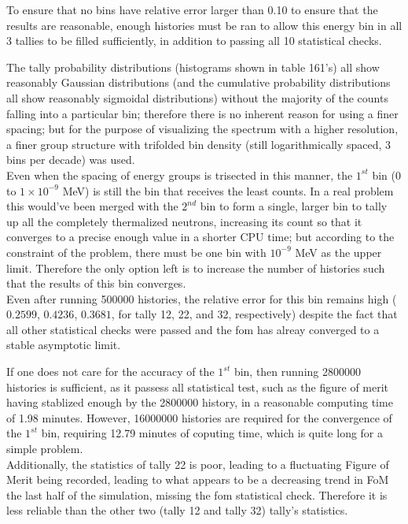 \documentclass[a4paper, 12pt]{article}
\begin{document}
To ensure that no bins have relative error larger than 0.10 to ensure that the results are reasonable, enough histories must be ran to allow this energy bin in all 3 tallies to be filled sufficiently, in addition to passing all 10 statistical checks.

The tally probability distributions (histograms shown in table 161's) all show reasonably Gaussian distributions (and the cumulative probability distributions all show reasonably sigmoidal distributions) without the majority of the counts falling into a particular bin; therefore there is no inherent reason for using a finer spacing; but for the purpose of visualizing the spectrum with a higher resolution, a finer group structure with trifolded bin density (still logarithmically spaced, 3 bins per decade) was used.
\\Even when the spacing of energy groups is trisected in this manner, the $1^{st}$ bin ($0$ to $1\times 10^{-9}$ MeV) is still the bin that receives the least counts. In a real problem this would've been merged with the $2^{nd}$ bin to form a single, larger bin to tally up all the completely thermalized neutrons, increasing its count so that it converges to a precise enough value in a shorter CPU time; but according to the constraint of the problem, there must be one bin with ${10^{-9}}$ MeV as the upper limit. Therefore the only option left is to increase the number of histories such that the results of this bin converges.
\\Even after running 500000 histories, the relative error for this bin remains high ($0.2599$, $0.4236$, $0.3681$, for tally 12, 22, and 32, respectively) despite the fact that all other statistical checks were passed and the fom has alreay converged to a stable asymptotic limit.

If one does not care for the accuracy of the $1^{st}$ bin, then running 2800000 histories is sufficient, as it passess all statistical test, such as the figure of merit having stablized enough by the 2800000 history, in a reasonable computing time of 1.98 minutes. However, 16000000 histories are required for the convergence of the $1^{st}$ bin, requiring 12.79 minutes of coputing time, which is quite long for a simple problem.
\\Additionally, the statistics of tally 22 is poor, leading to a fluctuating Figure of Merit being recorded, leading to what appears to be a decreasing trend in FoM the last half of the simulation, missing the fom statistical check. Therefore it is less reliable than the other two (tally 12 and tally 32) tally's statistics.
\end{document}
